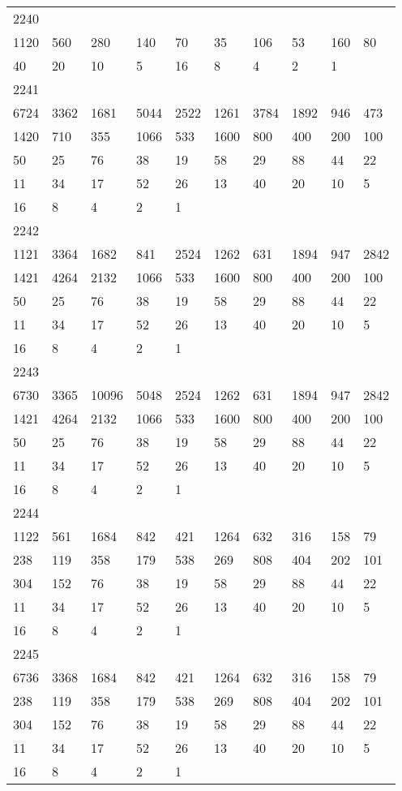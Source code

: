 \begin{longtable}{*{10}{l}}
2240&&&&&&&&&\\
1120& 560& 280& 140& 70& 35& 106& 53& 160& 80\\
40& 20& 10& 5& 16& 8& 4& 2& 1& \\

2241&&&&&&&&&\\
6724& 3362& 1681& 5044& 2522& 1261& 3784& 1892& 946& 473\\
1420& 710& 355& 1066& 533& 1600& 800& 400& 200& 100\\
50& 25& 76& 38& 19& 58& 29& 88& 44& 22\\
11& 34& 17& 52& 26& 13& 40& 20& 10& 5\\
16& 8& 4& 2& 1& \\

2242&&&&&&&&&\\
1121& 3364& 1682& 841& 2524& 1262& 631& 1894& 947& 2842\\
1421& 4264& 2132& 1066& 533& 1600& 800& 400& 200& 100\\
50& 25& 76& 38& 19& 58& 29& 88& 44& 22\\
11& 34& 17& 52& 26& 13& 40& 20& 10& 5\\
16& 8& 4& 2& 1& \\

2243&&&&&&&&&\\
6730& 3365& 10096& 5048& 2524& 1262& 631& 1894& 947& 2842\\
1421& 4264& 2132& 1066& 533& 1600& 800& 400& 200& 100\\
50& 25& 76& 38& 19& 58& 29& 88& 44& 22\\
11& 34& 17& 52& 26& 13& 40& 20& 10& 5\\
16& 8& 4& 2& 1& \\

2244&&&&&&&&&\\
1122& 561& 1684& 842& 421& 1264& 632& 316& 158& 79\\
238& 119& 358& 179& 538& 269& 808& 404& 202& 101\\
304& 152& 76& 38& 19& 58& 29& 88& 44& 22\\
11& 34& 17& 52& 26& 13& 40& 20& 10& 5\\
16& 8& 4& 2& 1& \\

2245&&&&&&&&&\\
6736& 3368& 1684& 842& 421& 1264& 632& 316& 158& 79\\
238& 119& 358& 179& 538& 269& 808& 404& 202& 101\\
304& 152& 76& 38& 19& 58& 29& 88& 44& 22\\
11& 34& 17& 52& 26& 13& 40& 20& 10& 5\\
16& 8& 4& 2& 1& \\


\end{longtable}
